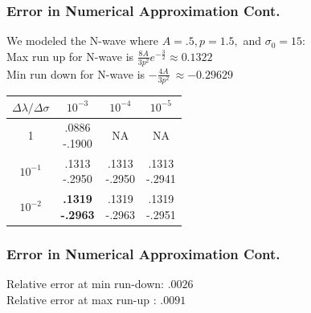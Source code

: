 	\begin{frame}
		\frametitle{Error in Numerical Approximation Cont.}
		
		We modeled the N-wave where $A=.5, p=1.5, $ and $ \sigma_0=15$:\\\vspace{5mm}
		Max run up for N-wave is $\frac{8A}{3p^2}e^{-\frac{3}{2}}\approx0.1322$\\\vspace{5mm}
		Min run down for N-wave is $-\frac{4A}{3p^2}\
		\approx-0.29629$\\\vspace{5mm}
		\begin{center}
		\begin{tabular}{|c|c|c|c|}\hline
		$\Delta\lambda/\Delta\sigma$&$10^{-3}$&$10^{-4}$&$10^{-5}$\\\hline
		1&\specialcell{.0886\\-.1900}&NA&NA\\\hline
		$10^{-1}$&\specialcell{.1313\\-.2950}&\specialcell{.1313\\-.2950}&\specialcell{.1313\\-.2941}\\\hline
		$10^{-2}$&\specialcell{\textbf{.1319}\\\textbf{-.2963}}&\specialcell{.1319\\-.2963}&\specialcell{.1319\\-.2951}\\\hline
		\end{tabular}
		\end{center}
	\end{frame}

	\begin{frame}
	\frametitle{Error in Numerical Approximation Cont.}
	
	Relative error at min run-down: $.0026$\\\vspace{5mm}
	Relative error at max run-up : $.0091$\\\vspace{5mm}
	
	\end{frame}

